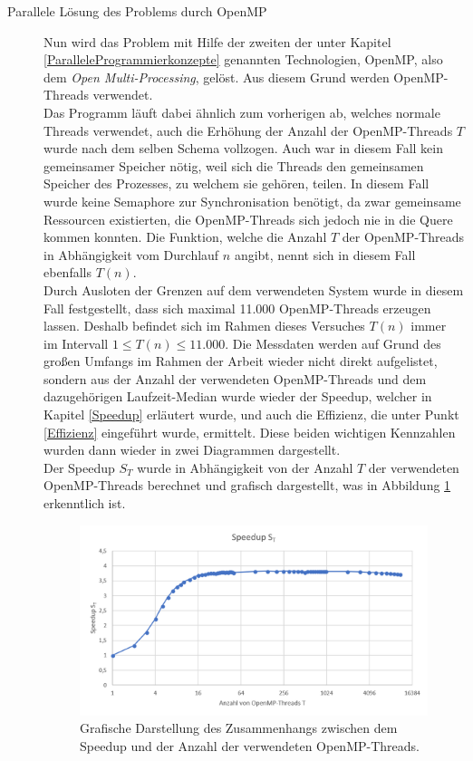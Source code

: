 \begin{description}
					\item[Parallele Lösung des Problems durch OpenMP]
					
						Nun wird das Problem mit Hilfe der zweiten der unter Kapitel \ref{ParalleleProgrammierkonzepte} genannten Technologien, OpenMP, also dem \textit{Open Multi-Processing}, gelöst. Aus diesem Grund werden OpenMP-Threads verwendet.\\
						Das Programm läuft dabei ähnlich zum vorherigen ab, welches normale Threads verwendet, auch die Erhöhung der Anzahl der OpenMP-Threads $T$ wurde nach dem selben Schema vollzogen. Auch war in diesem Fall kein gemeinsamer Speicher nötig, weil sich die Threads den gemeinsamen Speicher des Prozesses, zu welchem sie gehören, teilen. In diesem Fall wurde keine Semaphore zur Synchronisation benötigt, da zwar gemeinsame Ressourcen existierten, die OpenMP-Threads sich jedoch nie in die Quere kommen konnten. Die Funktion, welche die Anzahl $T$ der OpenMP-Threads in Abhängigkeit vom Durchlauf $n$ angibt, nennt sich in diesem Fall ebenfalls $T(n)$.\\
						Durch Ausloten der Grenzen auf dem verwendeten System wurde in diesem Fall festgestellt, dass sich maximal 11.000 OpenMP-Threads erzeugen lassen. Deshalb befindet sich im Rahmen dieses Versuches $T(n)$ immer im Intervall $1 \leq T(n) \leq 11.000$.
						Die Messdaten werden auf Grund des großen Umfangs im Rahmen der Arbeit wieder nicht direkt aufgelistet, sondern aus der Anzahl der verwendeten OpenMP-Threads und dem dazugehörigen Laufzeit-Median wurde wieder der Speedup, welcher in Kapitel \ref{Speedup} erläutert wurde, und auch die Effizienz, die unter Punkt \ref{Effizienz} eingeführt wurde, ermittelt. Diese beiden wichtigen Kennzahlen wurden dann wieder in zwei Diagrammen dargestellt.\\
						Der Speedup $S_T$ wurde in Abhängigkeit von der Anzahl $T$ der verwendeten OpenMP-Threads berechnet und grafisch dargestellt, was in Abbildung \ref{fig:Speedup_OpenMP} erkenntlich ist.
						
						\begin{figure}
							\centering	
							\includegraphics[width=11cm]{Abbildungen/Speedup_OpenMP.png}
							\caption{Grafische Darstellung des Zusammenhangs zwischen dem Speedup und der Anzahl der verwendeten OpenMP-Threads.}
							\label{fig:Speedup_OpenMP}
						\end{figure}
						

\end{description}
